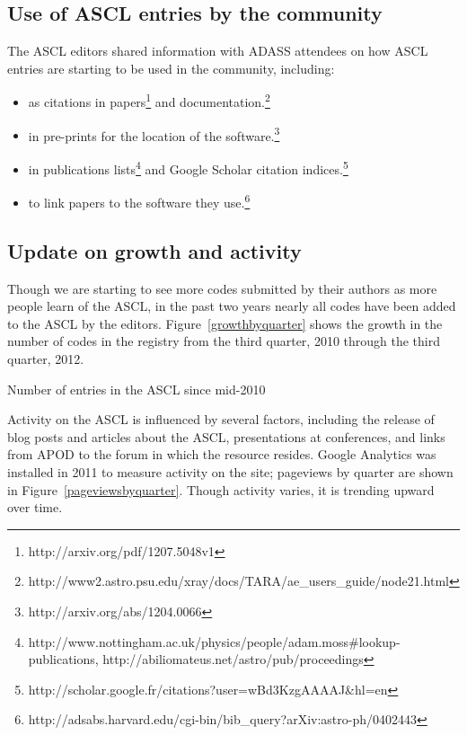 \subsection{Use of ASCL entries by the community}
The ASCL editors shared information with ADASS attendees on how ASCL entries are starting to be used in the community, including: 
\begin{itemize}

\item as citations in papers\footnote{http://arxiv.org/pdf/1207.5048v1} and documentation.\footnote{http://www2.astro.psu.edu/xray/docs/TARA/ae\_users\_guide/node21.html}

\item in pre-prints for the location of the software.\footnote{http://arxiv.org/abs/1204.0066}

\item in publications lists\footnote{http://www.nottingham.ac.uk/physics/people/adam.moss\#lookup-publications, http://abiliomateus.net/astro/pub/proceedings} and Google Scholar citation indices.\footnote{http://scholar.google.fr/citations?user=wBd3KzgAAAAJ\&hl=en}

\item to link papers to the software they use.\footnote{http://adsabs.harvard.edu/cgi-bin/bib\_query?arXiv:astro-ph/0402443}

\end{itemize}

\subsection{Update on growth and activity}
Though we are starting to see more codes submitted by their authors as more people learn of the ASCL, in the past two years nearly all codes have been added to the ASCL by the editors. Figure~\ref{growthbyquarter} shows the growth in the number of codes in the registry from the third quarter, 2010 through the third quarter, 2012.

{Number of entries in the ASCL since mid-2010}

Activity on the ASCL is influenced by several factors, including the release of blog posts and articles about the ASCL, presentations at conferences, and links from APOD to the forum in which the resource resides. Google Analytics was installed in 2011 to measure activity on the site; pageviews by quarter are shown in Figure~\ref{pageviewsbyquarter}. Though activity varies, it is trending upward over time. 

